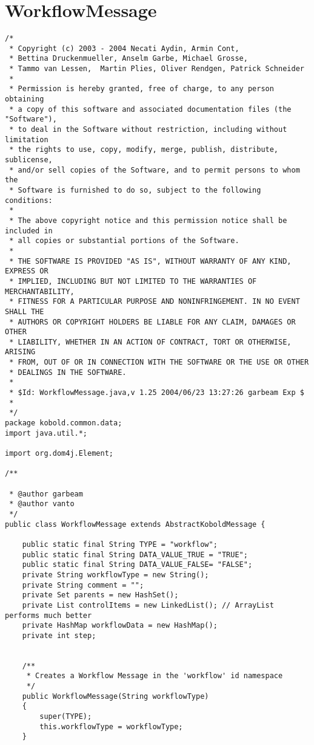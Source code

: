 \section{WorkflowMessage}
\small \begin{verbatim}
/*
 * Copyright (c) 2003 - 2004 Necati Aydin, Armin Cont, 
 * Bettina Druckenmueller, Anselm Garbe, Michael Grosse, 
 * Tammo van Lessen,  Martin Plies, Oliver Rendgen, Patrick Schneider
 * 
 * Permission is hereby granted, free of charge, to any person obtaining
 * a copy of this software and associated documentation files (the "Software"),
 * to deal in the Software without restriction, including without limitation
 * the rights to use, copy, modify, merge, publish, distribute, sublicense, 
 * and/or sell copies of the Software, and to permit persons to whom the 
 * Software is furnished to do so, subject to the following conditions:
 *
 * The above copyright notice and this permission notice shall be included in 
 * all copies or substantial portions of the Software.
 *
 * THE SOFTWARE IS PROVIDED "AS IS", WITHOUT WARRANTY OF ANY KIND, EXPRESS OR 
 * IMPLIED, INCLUDING BUT NOT LIMITED TO THE WARRANTIES OF MERCHANTABILITY, 
 * FITNESS FOR A PARTICULAR PURPOSE AND NONINFRINGEMENT. IN NO EVENT SHALL THE 
 * AUTHORS OR COPYRIGHT HOLDERS BE LIABLE FOR ANY CLAIM, DAMAGES OR OTHER 
 * LIABILITY, WHETHER IN AN ACTION OF CONTRACT, TORT OR OTHERWISE, ARISING 
 * FROM, OUT OF OR IN CONNECTION WITH THE SOFTWARE OR THE USE OR OTHER 
 * DEALINGS IN THE SOFTWARE.
 *
 * $Id: WorkflowMessage.java,v 1.25 2004/06/23 13:27:26 garbeam Exp $
 *
 */
package kobold.common.data;
import java.util.*;

import org.dom4j.Element;

/**
 
 * @author garbeam
 * @author vanto
 */
public class WorkflowMessage extends AbstractKoboldMessage {
	
	public static final String TYPE = "workflow";
	public static final String DATA_VALUE_TRUE = "TRUE";
	public static final String DATA_VALUE_FALSE= "FALSE";
	private String workflowType = new String();
	private String comment = "";
	private Set parents = new HashSet();
	private List controlItems = new LinkedList(); // ArrayList performs much better
	private HashMap workflowData = new HashMap();
	private int step;


	/**
	 * Creates a Workflow Message in the 'workflow' id namespace
	 */
	public WorkflowMessage(String workflowType)
	{
		super(TYPE);
		this.workflowType = workflowType;
	}
	

\end{verbatim}
